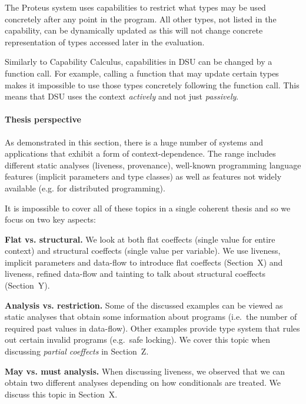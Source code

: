 The Proteus system uses capabilities to restrict what types may be used concretely after any point
in the program. All other types, not listed in the capability, can be dynamically updated as this
will not change concrete representation of types accessed later in the evaluation.

Similarly to Capability Calculus, capabilities in DSU can be changed by a function call. For 
example, calling a function that may update certain types makes it impossible to use those types
concretely following the function call. This means that DSU uses the context \emph{actively}
and not just \emph{passively}.


\paragraph{Thesis perspective}

As demonstrated in this section, there is a huge number of systems and applications that exhibit
a form of context-dependence. The range includes different static analyses (liveness, provenance), 
well-known programming language features (implicit parameters and type classes) as well as features
not widely available (e.g. for distributed programming).

It is impossible to cover all of these topics in a single coherent thesis and so we focus on 
two key aspects:

\begin{compactitem}
\item \textbf{Flat vs. structural.} We look at both flat coeffects (single value for entire context) and 
  structural coeffects (single value per variable). We use liveness, implicit parameters and 
  data-flow to introduce flat coeffects (Section~X) and liveness, refined data-flow and tainting
  to talk about structural coeffects (Section~Y).
  
\item \textbf{Analysis vs. restriction.} Some of the discussed examples can be viewed as static
  analyses that obtain some information about programs (i.e.~the number of required past values
  in data-flow). Other examples provide type system that rules out certain invalid programs 
  (e.g.~safe locking). We cover this topic when discussing \emph{partial coeffects} in Section~Z.
  
\item \textbf{May vs. must analysis.} When discussing liveness, we observed that we can obtain 
  two different analyses depending on how conditionals are treated. We discuss this topic in 
  Section~X. %
\end{compactitem}

